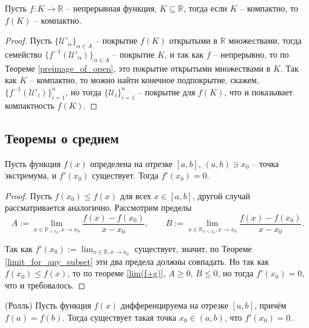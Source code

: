 \begin{theorem}\label{image_of_compact}
    Пусть $f:K\to \mathbb{R}$ -- непрерывная функция, $K \subseteq \mathbb{R}$, тогда если $K$ -- компактно, то $f(K)$ -- компактно.
\end{theorem}

\begin{proof}
    Пусть $\{\mathscr{U}'_\alpha\}_{\alpha \in A}$ -- покрытие $f(K)$ открытыми в $\mathbb{R}$ множествами, тогда семейство $\{f^{-1}(\mathscr{U}'_\alpha)\}_{\alpha \in A}$ -- покрытие $K$, и так как $f$ -- непрерывно, то по Теореме \ref{preimage_of_open}, это покрытие открытыми множествами в $K.$ Так как $K$ -- компактно, то можно найти конечное подпокрытие, скажем, $\{f^{-1}(\mathscr{U}'_i)\}_{i=1}^n$, но тогда $\{\mathscr{U}_i\}_{i=1}^n$ -- покрытие для $f(K)$, что и показывает компактность $f(K).$
\end{proof}



\subsection{Теоремы о среднем}


\begin{theorem}[Ферма]\label{Ferma}
    Пусть функция $f(x)$ определена на отрезке $[a,b]$, $(a,b) \ni x_0$ -- точка экстремума, и $f'(x_0)$ существует. Тогда $f'(x_0) = 0$.
\end{theorem}

\begin{proof}
    Пусть $f(x_0) \le f(x)$ для всех $x \in [a,b]$, другой случай рассматривается аналогично. Рассмотрим пределы
    \[
    A:= \lim_{x \in \mathbb{R}_{>x_0}, x\to x_0} \frac{f(x) - f(x_0)}{x-x_0}, \qquad B:=\lim_{x \in \mathbb{R}_{x<x_0}, x\to x_0} \frac{f(x) - f(x_0)}{x-x_0}.
    \]

Так как $f'(x_0) := \lim_{x\in \mathbb{R}, x \to x_0}$ существует, значит, по Теореме \ref{limit_for_any_subset} эти два предела должны совпадать. Но так как  $f(x_0) \le f(x)$, то по теореме \ref{lim(f+g)}, $A\ge 0$, $B\le 0$, но тогда $f'(x_0) =0$, что и требовалось. 
\end{proof}


\begin{theorem}(Ролль) \label{Roll}
    Пусть функция $f(x)$ дифференцируема на отрезке $[a,b]$, причём $f(a) = f(b)$. Тогда существует такая точка $x_0 \in (a,b)$, что $f'(x_0) = 0.$
\end{theorem}


